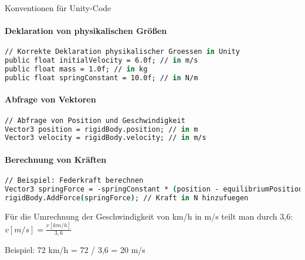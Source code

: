 \begin{KR}{Konventionen für Unity-Code}\\
    \paragraph{Deklaration von physikalischen Größen}
    \begin{lstlisting}[language=csh, style=basesmol]
// Korrekte Deklaration physikalischer Groessen in Unity
public float initialVelocity = 6.0f; // in m/s
public float mass = 1.0f; // in kg
public float springConstant = 10.0f; // in N/m
    \end{lstlisting}
    
    \paragraph{Abfrage von Vektoren}
    \begin{lstlisting}[language=csh, style=basesmol]
// Abfrage von Position und Geschwindigkeit
Vector3 position = rigidBody.position; // in m
Vector3 velocity = rigidBody.velocity; // in m/s
    \end{lstlisting}
    
    \paragraph{Berechnung von Kräften}
    \begin{lstlisting}[language=csh, style=basesmol]
// Beispiel: Federkraft berechnen
Vector3 springForce = -springConstant * (position - equilibriumPosition);
rigidBody.AddForce(springForce); // Kraft in N hinzufuegen
    \end{lstlisting}
\end{KR}

\begin{example}
    Für die Umrechnung der Geschwindigkeit von km/h in m/s teilt man durch 3,6:
    $v[m/s] = \frac{v[km/h]}{3,6}$
    
    Beispiel: 72 km/h = 72 / 3,6 = 20 m/s
\end{example}